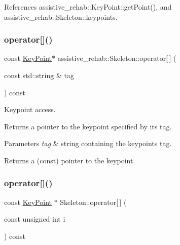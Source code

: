 References assistive\+\_\+rehab\+::\+Key\+Point\+::get\+Point(), and assistive\+\_\+rehab\+::\+Skeleton\+::keypoints.

\mbox{\label{classassistive__rehab_1_1Skeleton_a3ecc7418af653c88e40d41bb379b7271}} 
\subsubsection{\texorpdfstring{operator[]()}{operator[]()}\hspace{0.1cm}{\footnotesize\ttfamily [1/2]}}
{\footnotesize\ttfamily const \mbox{\hyperlink{classassistive__rehab_1_1KeyPoint}{Key\+Point}}$\ast$ assistive\+\_\+rehab\+::\+Skeleton\+::operator\mbox{[}$\,$\mbox{]} (\begin{DoxyParamCaption}\item[{const std\+::string \&}]{tag }\end{DoxyParamCaption}) const\hspace{0.3cm}{\ttfamily [inherited]}}



Keypoint access. 

Returns a pointer to the keypoint specified by its tag. 
\begin{DoxyParams}{Parameters}
{\em tag} & string containing the keypoint\textquotesingle{}s tag. \\
\hline
\end{DoxyParams}
\begin{DoxyReturn}{Returns}
a (const) pointer to the keypoint. 
\end{DoxyReturn}
\mbox{\label{classassistive__rehab_1_1Skeleton_a0692ab89f16b0914b9ca9e0d4a07e52c}} 
\subsubsection{\texorpdfstring{operator[]()}{operator[]()}\hspace{0.1cm}{\footnotesize\ttfamily [2/2]}}
{\footnotesize\ttfamily const \mbox{\hyperlink{classassistive__rehab_1_1KeyPoint}{Key\+Point}} $\ast$ Skeleton\+::operator\mbox{[}$\,$\mbox{]} (\begin{DoxyParamCaption}\item[{const unsigned int}]{i }\end{DoxyParamCaption}) const\hspace{0.3cm}{\ttfamily [inherited]}}



